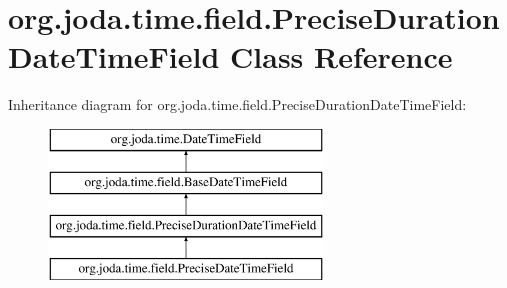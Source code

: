 \hypertarget{classorg_1_1joda_1_1time_1_1field_1_1_precise_duration_date_time_field}{\section{org.\-joda.\-time.\-field.\-Precise\-Duration\-Date\-Time\-Field Class Reference}
\label{classorg_1_1joda_1_1time_1_1field_1_1_precise_duration_date_time_field}
}
Inheritance diagram for org.\-joda.\-time.\-field.\-Precise\-Duration\-Date\-Time\-Field\-:\begin{figure}[H]
\begin{center}
\leavevmode
\includegraphics[height=4.000000cm]{classorg_1_1joda_1_1time_1_1field_1_1_precise_duration_date_time_field}
\end{center}
\end{figure}

